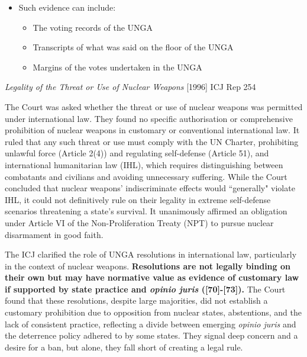 \begin{itemize}
    \item Such evidence can include:
    \begin{itemize}
        \item The voting records of the UNGA
        \item Transcripts of what was said on the floor of the UNGA
        \item Margins of the votes undertaken in the UNGA
    \end{itemize}
\end{itemize}

\begin{casedetails}{\textit{Legality of the Threat or Use of Nuclear Weapons} [1996] ICJ Rep 254}\label{case:Legality of Nuclear Weapons [1996] ICJ Rep 254}
    \flushleft
    
    The Court was asked whether the threat or use of nuclear weapons was permitted under international law. They found no specific authorisation or comprehensive prohibition of nuclear weapons in customary or conventional international law. It ruled that any such threat or use must comply with the UN Charter, prohibiting unlawful force (Article 2(4)) and regulating self-defense (Article 51), and international humanitarian law (IHL), which requires distinguishing between combatants and civilians and avoiding unnecessary suffering. While the Court concluded that nuclear weapons' indiscriminate effects would ``generally" violate IHL, it could not definitively rule on their legality in extreme self-defense scenarios threatening a state's survival. It unanimously affirmed an obligation under Article VI of the Non-Proliferation Treaty (NPT) to pursue nuclear disarmament in good faith.

    \vspace{\baselineskip}
    
    The ICJ clarified the role of UNGA resolutions in international law, particularly in the context of nuclear weapons. \textbf{Resolutions are not legally binding on their own but may have normative value as evidence of customary law if supported by state practice and \textit{opinio juris} ([70]-[73]).} The Court found that these resolutions, despite large majorities, did not establish a customary prohibition due to opposition from nuclear states, abstentions, and the lack of consistent practice, reflecting a divide between emerging \textit{opinio juris} and the deterrence policy adhered to by some states. They signal deep concern and a desire for a ban, but alone, they fall short of creating a legal rule.


\end{casedetails}

